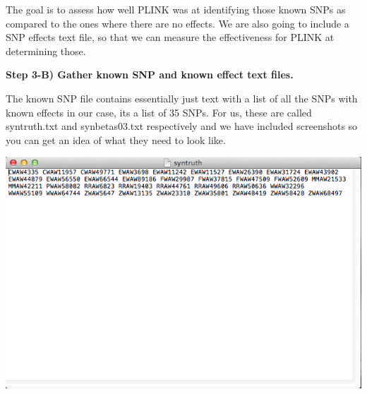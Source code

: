 \documentclass[twoside,a4paper]{refart}
\begin{document}
The goal is to assess how well PLINK was at identifying those known SNPs as compared to the ones where there are no effects. We are also going to include a SNP effects text file, so that we can measure the effectiveness for PLINK at determining those. 

\begin{center}
\end{center}

\textbf{Step 3-B) Gather known SNP and known effect text files.}

The known SNP file contains essentially just text with a list of all the SNPs with known effects in our case, its a list of 35 SNPs. For us, these are called syntruth.txt and synbetas03.txt respectively and we have included screenshots so you can get an idea of what they need to look like.

\includegraphics[width=\textwidth]{doc_step3_2}
\end{document}
